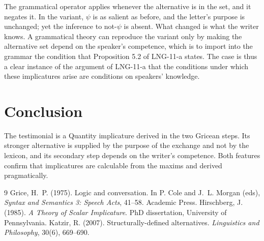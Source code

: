 \documentclass{situationist-preprint}
\begin{document}
\begin{reply}
The grammatical operator applies whenever the alternative is in the set, and it negates it. In the variant, $\psi$ is as salient as before, and the letter's purpose is unchanged; yet the inference to not-$\psi$ is absent. What changed is what the writer knows. A grammatical theory can reproduce the variant only by making the alternative set depend on the speaker's competence, which is to import into the grammar the condition that Proposition 5.2 of LNG-11-a states. The case is thus a clear instance of the argument of LNG-11-a that the conditions under which these implicatures arise are conditions on speakers' knowledge.
\end{reply}

\section{Conclusion}

The testimonial is a Quantity implicature derived in the two Gricean steps. Its stronger alternative is supplied by the purpose of the exchange and not by the lexicon, and its secondary step depends on the writer's competence. Both features confirm that implicatures are calculable from the maxims and derived pragmatically.

\begin{thebibliography}{9}\small
{} Grice, H.~P. (1975). Logic and conversation. In P. Cole and J.~L. Morgan (eds), \emph{Syntax and Semantics 3: Speech Acts}, 41--58. Academic Press.
 Hirschberg, J. (1985). \emph{A Theory of Scalar Implicature}. PhD dissertation, University of Pennsylvania.
 Katzir, R. (2007). Structurally-defined alternatives. \emph{Linguistics and Philosophy}, 30(6), 669--690.
\end{thebibliography}
\end{document}
